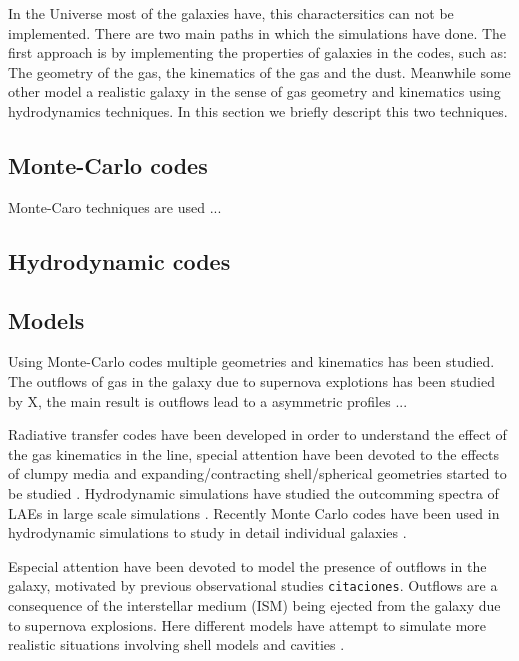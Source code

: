 In the Universe most of the galaxies have, this charactersitics
can not be implemented. There are two main paths in which the 
simulations have done. The first approach is by implementing 
the properties of galaxies in the codes, such as: The geometry
of the gas, the kinematics of the gas and the dust. Meanwhile 
some other model a realistic galaxy in the sense of gas geometry
and kinematics using hydrodynamics techniques. In this section 
we briefly descript this two techniques. 

\subsection{Monte-Carlo codes}

Monte-Caro techniques are used ...

\subsection{Hydrodynamic codes} 

\subsection{Models}

Using Monte-Carlo codes multiple geometries and kinematics has been 
studied. The outflows of gas in the galaxy due to supernova explotions
has been studied by X, the main result is outflows lead to a asymmetric
profiles ...

 Radiative transfer codes \citep{DijkstraKramer, Laursen09, Verhamme06, CLARA} 
have been developed in order to understand the effect of the gas kinematics in 
the \lya line, special attention have been devoted to the effects of clumpy 
media \citep{Hansen06} and expanding/contracting shell/spherical geometries 
started to be studied \citep{Ahn03,Verhamme06,Dijkstra06}. 
Hydrodynamic simulations have studied the outcomming spectra of 
LAEs in large scale simulations \cite{Forero12}. Recently Monte Carlo codes have 
been used in hydrodynamic simulations to study in detail individual galaxies 
\citep{Laursen09,Barnes11,Verhamme12,Yajima12}.

Especial attention have been devoted to model the presence of outflows in the galaxy, 
motivated by previous observational studies \verb+citaciones+. 
Outflows are a consequence of the interstellar medium (ISM) being ejected 
from the galaxy due to supernova explosions. Here different models have 
attempt to simulate more realistic situations involving shell models and cavities \citep{Behrens2014}.


